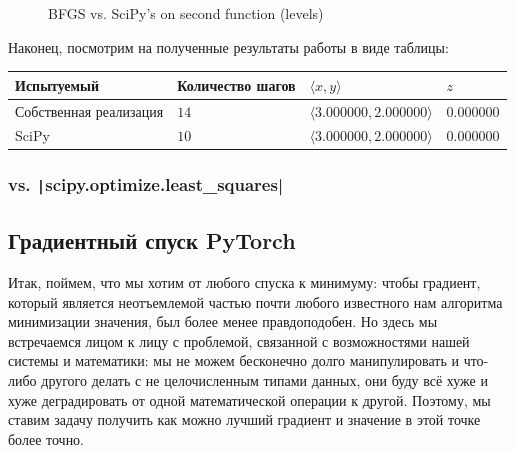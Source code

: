 \documentclass[12pt, a4paper, oneside, final]{article}
\begin{document}
\begin{figure}[H]
		\caption*{BFGS vs. SciPy's on second function (levels)}
	\end{figure}
	Наконец, посмотрим на полученные результаты работы в виде таблицы:
	\begin{table}[H]
		\centering
		\begin{tabular}{l|l|l|l}
			Испытуемый & Количество шагов & $\langle x, y \rangle$ & $z$ \\ \hline
			Собственная реализация & $14$ & $\langle 3.000000, 2.000000 \rangle$ & $0.000000$ \\
			SciPy & $10$ & $\langle 3.000000, 2.000000 \rangle$ & $0.000000$
		\end{tabular}
	\end{table}
	\subsubsection*{vs. \texttt|scipy.optimize.least_squares|}
	\subsection*{Градиентный спуск PyTorch}
	Итак, поймем, что мы хотим от любого спуска к минимуму: чтобы градиент, который является неотъемлемой частью почти любого известного нам алгоритма минимизации значения, был более менее правдоподобен.
	Но здесь мы встречаемся лицом к лицу с проблемой, связанной с возможностями нашей системы и математики: мы не можем бесконечно долго манипулировать и что-либо другого делать с не целочисленным типами данных, они буду всё хуже и хуже деградировать от одной математической операции к другой.
	Поэтому, мы ставим задачу получить как можно лучший градиент и значение в этой точке более точно.
\end{document}
